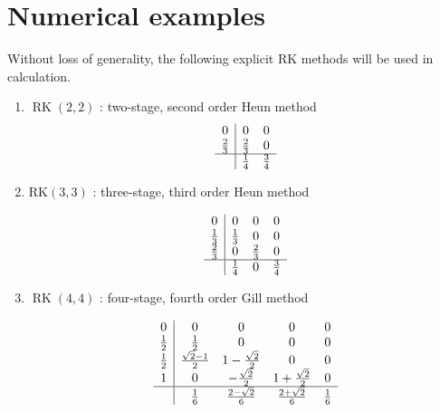 \documentclass[aspectratio=169]{beamer}
\begin{document}
	\section{Numerical examples}
	\begin{frame}%
	\footnotesize Without loss of generality, the following explicit RK methods will be used in calculation.
	  \begin{enumerate}
		\item $\operatorname{RK}(2,2)$ : two-stage, second order Heun method %
		\begin{equation}
		\begin{array}{c|cc}
		0 & 0 & 0 \\
		\frac{2}{3} & \frac{2}{3} & 0 \\
		\hline & \frac{1}{4} & \frac{3}{4}
		\end{array}
		\end{equation}
	
		\item $\mathrm{RK}(3,3)$ : three-stage, third order Heun method %
	
		\begin{equation}
		\begin{array}{c|ccc}
		0 & 0 & 0 & 0 \\
		\frac{1}{3} & \frac{1}{3} & 0 & 0 \\
		\frac{2}{3} & 0 & \frac{2}{3} & 0 \\
		\hline & \frac{1}{4} & 0 & \frac{3}{4}
		\end{array}
		\end{equation}
	
		\item $\operatorname{RK}(4,4)$ : four-stage, fourth order Gill method %
	
		\begin{equation}
		\begin{array}{c|cccc}
		0 & 0 & 0 & 0 & 0 \\
		\frac{1}{2} & \frac{1}{2} & 0 & 0 & 0 \\
		\frac{1}{2} & \frac{\sqrt{2}-1}{2} & 1-\frac{\sqrt{2}}{2} & 0 & 0 \\
		1 & 0 & -\frac{\sqrt{2}}{2} & 1+\frac{\sqrt{2}}{2} & 0 \\
		\hline & \frac{1}{6} & \frac{2-\sqrt{2}}{6} & \frac{2+\sqrt{2}}{6} & \frac{1}{6}
		\end{array}
		\end{equation}
		\end{enumerate}
	\end{frame}
\end{document}
